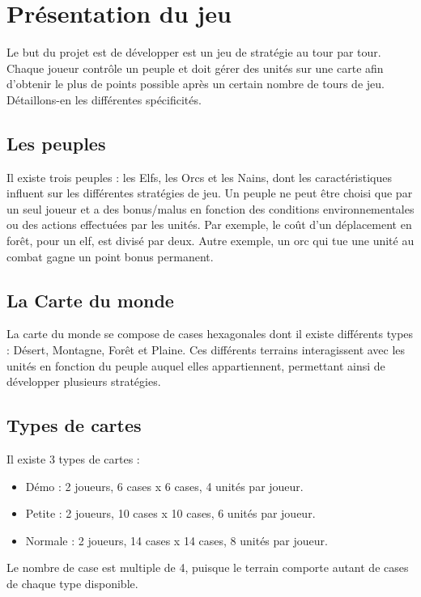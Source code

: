 \section{Présentation du jeu}
Le but du projet est de développer est un jeu de stratégie au tour par tour. Chaque joueur contrôle un peuple et doit gérer des unités sur une carte afin d'obtenir le plus de points possible après un certain nombre de tours de jeu. Détaillons-en les différentes spécificités.
\subsection{Les peuples}
Il existe trois peuples : les Elfs, les Orcs et les Nains, dont les caractéristiques influent sur les différentes stratégies de jeu. Un peuple ne peut être choisi que par un seul joueur et a des bonus/malus en fonction des conditions environnementales ou des actions effectuées par les unités. Par exemple, le coût d'un déplacement en forêt, pour un elf, est divisé par deux. Autre exemple, un orc qui tue une unité au combat gagne un point bonus permanent.

\subsection{La Carte du monde}
La carte du monde se compose de cases hexagonales dont il existe différents types : Désert, Montagne, Forêt et Plaine. Ces différents terrains interagissent avec les unités en fonction du peuple auquel elles appartiennent, permettant ainsi de développer plusieurs stratégies.

\subsection{Types de cartes}
Il existe 3 types de cartes :
\begin{itemize}
  \item Démo : 2 joueurs, 6 cases x 6 cases, 4 unités par joueur.
  \item Petite : 2 joueurs, 10 cases x 10 cases, 6 unités par joueur.
  \item Normale :  2 joueurs, 14 cases x 14 cases, 8 unités par joueur.
\end{itemize}
Le nombre de case est multiple de 4, puisque le terrain comporte autant de cases de chaque type disponible.
